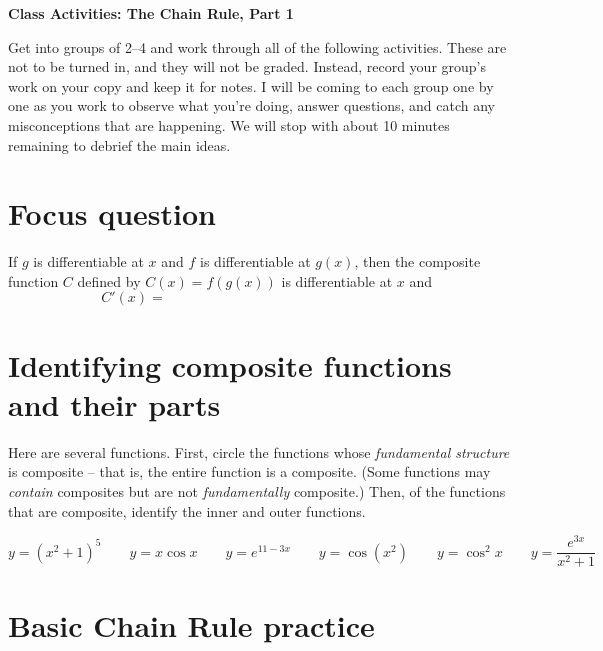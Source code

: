 \documentclass[11pt]{article}
\begin{document}
	
	\thispagestyle{empty}
	\renewcommand{\headrulewidth}{0.0pt}
	\thispagestyle{fancy}
	\lfoot{}
	\cfoot{}
	\rfoot{}	
	
	\vspace*{0in}

		\begin{center}
			\begin{large}
			\textbf{Class Activities: The Chain Rule, Part 1} \\
			\end{large}
		\end{center}
	
Get into groups of 2--4 and work through all of the following activities. These are not to be turned in, and they will not be graded. Instead, record your group's work on your copy and keep it for notes. I will be coming to each group one by one as you work to observe what you're doing, answer questions, and catch any misconceptions that are happening. We will stop with about 10 minutes remaining to debrief the main ideas. \\

\section{Focus question}

If $g$ is differentiable at $x$ and $f$ is differentiable at $g(x)$, then the composite function $C$ defined by $C(x) = f(g(x))$ is differentiable at $x$ and 
\[ C'(x) = \hspace{3in} \]


\section{Identifying composite functions and their parts}
Here are several functions. First, circle the functions whose \emph{fundamental structure} is composite -- that is, the entire function is a composite. (Some functions may \emph{contain} composites but are not \emph{fundamentally} composite.) Then, of the functions that are composite, identify the inner and outer functions. 

\begin{equation*}
	y = (x^2 + 1)^5 \qquad y = x \cos x \qquad y = e^{11-3x} \qquad y = \cos(x^2) \qquad y = \cos^2 x \qquad y = \frac{e^{3x}}{x^2 + 1}
\end{equation*}
	
	
\section{Basic Chain Rule practice}
\end{document}
